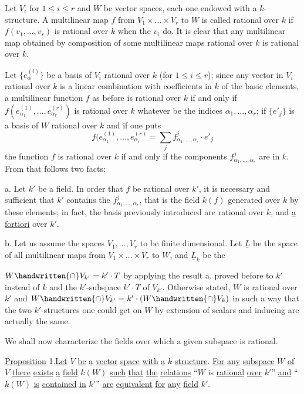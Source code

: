 Let $V_i$ for $1\leq i\leq r$ and $W$ be vector spaces, each one endowed with a $k$-structure. A multilinear map $f$ from $V_1\times\ldots\times V_r$ to $W$ is called rational over $k$ if $f(v_1,\ldots,v_r)$ is rational over $k$ when the $v_i$ do. It is clear that any multilinear map obtained by composition of some multilinear maps rational over $k$ is rational over $k$.

Let $\{e_\alpha^{(i)}\}$ be a basis of $V_i$ rational over $k$ (for $1\leq i\leq r$); since any vector in $V_i$ rational over $k$ is a linear combination with coefficients in $k$ of the basic elements, a multilinear function $f$ as before is rational over $k$ if and only if $f(e_{\alpha_1}^{(1)},\ldots,e_{\alpha_r}^{(r)})$ is rational over $k$ whatever be the indices $\alpha_1,\ldots,\alpha_r$; if $\{e'_j\}$ is a basis of $W$ rational over $k$ and if one puts
\[
f(e_{\alpha_1}^{(1)},\ldots,e_{\alpha_r}^{(r)}=\sum_j f^j_{\alpha_1,\ldots,\alpha_r}\cdot e'_j
\tag*{(4)}
\]
the function $f$ is rational over $k$ if and only if the components $f^j_{\alpha_1,\ldots,\alpha_r}$ are in $k$. From that follows two facts:

a. Let $k'$ be a field. In order that $f$ be rational over $k'$, it is necessary and sufficient that $k'$ contains the $f^j_{\alpha_1,\ldots,\alpha_r}$, that is the field $k(f)$ generated over $k$ by these elements; in fact, the basis previously introduced are rational over $k$, and \uline{a fortiori} over $k'$.

b. Let us assume the spaces $V_1,\ldots,V_r$ to be finite dimensional. Let $\underline{L}$ be the space of all multilinear maps from $V_1\times\ldots\times V_r$ to $W$, and $\underline{L}_k$ be the

\margin{\handwritten{\unsure{!}}}


$W\handwritten{\cap}V_{k'}=k'\cdot T$ by applying the result a. proved before to $k'$ instead of $k$ and the $k'$-subspace $k'\cdot T$ of $V_{k'}$. Otherwise stated, $W$ is rational over $k'$ and $W\handwritten{\cap}V_{k'}=k'\cdot(W\handwritten{\cap}V_k)$ in such a way that the two $k'$-structures one could get on $W$ by extension of scalars and inducing are actually the same.

We shall now characterize the fields over which a given subspace is rational.

\uline{Proposition} 1.\quad \uline{Let} $V$ \uline{be} \uline{a} \uline{vector} \uline{space} \uline{with} \uline{a} $k$-\uline{structure}. \uline{For} \uline{any} \uline{subspace} $W$ \uline{of} $V$ \uline{there} \uline{exists} \uline{a} \uline{field} $k(W)$ \uline{such} \uline{that} \uline{the} \uline{relations} ``$W$ is \uline{rational} \uline{over} $k'$'' \uline{and} ``$k(W)$ \uline{is} \uline{contained} \uline{in} $k'$'' \uline{are} \uline{equivalent} \uline{for} \uline{any} \uline{field} $k'$.

